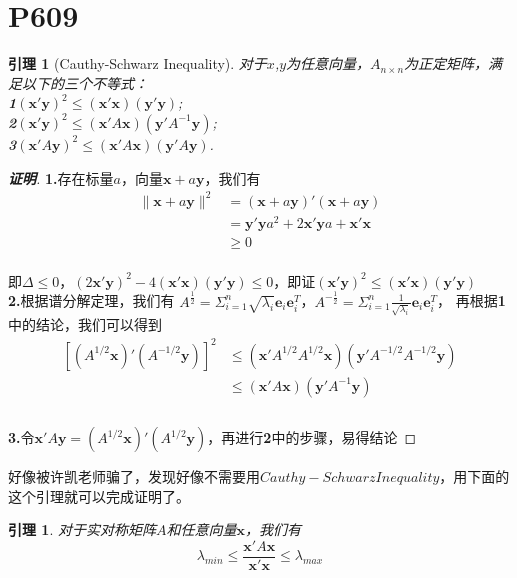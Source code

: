 \documentclass[12pt, a4paper, oneside]{ctexbook}
\newtheorem{lemma}[theorem]{引理}
\newcommand\zm[2]{\begin{proof}[\textbf{#1}]
    #2
\end{proof}}
\newcommand\bv[1]{\boldsymbol{#1}}
\begin{document}
\section{P609}
\begin{lemma}[Cauthy-Schwarz Inequality]
    对于$x$,$y$为任意向量，$A_{n\times n}$为正定矩阵，满足以下的三个不等式：\\
    \textbf{1}\;$(\bv{x}'\bv{y})^2 \leq  (\bv{x}'\bv{x})(\bv{y}'\bv{y})$;\\
    \textbf{2}\;$(\bv{x}'\bv{y})^2 \leq  (\bv{x}'A\bv{x})(\bv{y}'A^{-1}\bv{y})$;\\
    \textbf{3}\;$(\bv{x}'A\bv{y})^2 \leq  (\bv{x}'A\bv{x})(\bv{y}'A\bv{y})$.
\end{lemma}
\zm{证明}{\textbf{1.}\;存在标量$a$，向量$\bv{x}+a\bv{y}$，我们有
    \begin{equation*}
        \begin{aligned}
            \|\bv{x}+a\bv{y}\|^2 & = (\bv{x}+a\bv{y})'(\bv{x}+a\bv{y})                  \\
                                 & = \bv{y}'\bv{y}a^2 + 2\bv{x}'\bv{y}a + \bv{x}'\bv{x} \\
                                 & \geq 0                                               \\
        \end{aligned}
    \end{equation*}
    \par 即$\Delta \leq 0$，$(2\bv{x}'\bv{y})^2 - 4(\bv{x}'\bv{x})(\bv{y}'\bv{y}) \leq 0$，即证$(\bv{x}'\bv{y})^2 \leq  (\bv{x}'\bv{x})(\bv{y}'\bv{y})$\\
    \textbf{2.}\;根据谱分解定理，我们有
    $A^{\frac{1}{2}}=\Sigma_{i=1}^{n}\sqrt{\lambda_{i}}\bv{e}_{i}\bv{e}_{i}^{T}$，$A^{-\frac{1}{2}}=\Sigma_{i=1}^{n}\frac{1}{\sqrt{\lambda_{i}}}\bv{e}_{i}\bv{e}_{i}^{T}$，
    再根据\textbf{1}中的结论，我们可以得到
    \begin{equation*}
        \begin{aligned}
            [(A^{1/2}\bv{x})'(A^{-1/2}\bv{y})]^2 & \leq (\bv{x}'A^{1/2}A^{1/2}\bv{x})(\bv{y}'A^{-1/2}A^{-1/2}\bv{y}) \\
                                                 & \leq (\bv{x}'A\bv{x})(\bv{y}'A^{-1}\bv{y})                        \\
        \end{aligned}
    \end{equation*}\\
    \textbf{3.}\;令$\bv{x}'A\bv{y}=(A^{1/2}\bv{x})'(A^{1/2}\bv{y})$，再进行\textbf{2}中的步骤，易得结论
}
\par 好像被许凯老师骗了，发现好像不需要用$Cauthy-Schwarz Inequality$，用下面的这个引理就可以完成证明了。
\begin{lemma}
    对于实对称矩阵$A$和任意向量$\bv{x}$，我们有$$
        \lambda_{min} \leq \frac{\bv{x}'A\bv{x}}{\bv{x'x}} \leq \lambda_{max}
    $$
\end{lemma}
\end{document}

